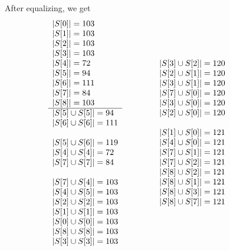 \documentclass[12pt]{article}
\theoremstyle{definition}
\begin{document}
After equalizing, we get 
\[
 \begin{array}[t]{l@{\qquad\qquad}l@{\qquad\qquad}l}
\begin{array}{l}
|S[0]| = 103 \\
|S[1]| = 103 \\
|S[2]| = 103 \\
|S[3]| = 103 \\
|S[4]| = 72 \\
|S[5]| = 94 \\
|S[6]| = 111 \\
|S[7]| = 84 \\
|S[8]| = 103 \\
\hline
|S[5] \cup S[5]| = 94 \\
|S[6] \cup S[6]| = 111 \\
  \\
|S[5] \cup S[6]| = 119 \\
|S[4] \cup S[4]| = 72 \\
|S[7] \cup S[7]| = 84 \\
  \\
|S[7] \cup S[4]| = 103 \\
|S[4] \cup S[5]| = 103 \\
|S[2] \cup S[2]| = 103 \\
|S[1] \cup S[1]| = 103 \\
|S[0] \cup S[0]| = 103 \\
|S[8] \cup S[8]| = 103 \\
|S[3] \cup S[3]| = 103 \\
 \end{array}
&
  \begin{array}{l}
|S[3] \cup S[2]| = 120 \\
|S[2] \cup S[1]| = 120 \\
|S[3] \cup S[1]| = 120 \\
|S[7] \cup S[0]| = 120 \\
|S[3] \cup S[0]| = 120 \\
|S[2] \cup S[0]| = 120 \\
  \\
|S[1] \cup S[0]| = 121 \\
|S[4] \cup S[0]| = 121 \\
|S[7] \cup S[1]| = 121 \\
|S[7] \cup S[2]| = 121 \\
|S[8] \cup S[2]| = 121 \\
|S[8] \cup S[1]| = 121 \\
|S[8] \cup S[3]| = 121 \\
|S[8] \cup S[7]| = 121 \\

\end{array}
\end{array}\]
\end{document}
